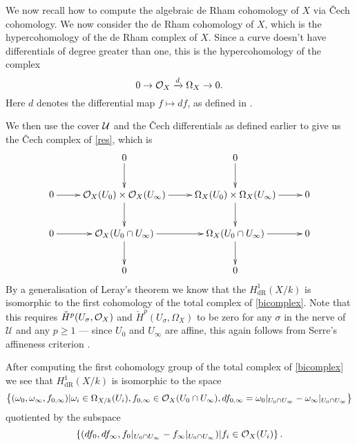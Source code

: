 \documentclass[draft, 11pt]{article} %
\theoremstyle{plain}
\theoremstyle{remark}
\newcommand{\cO}{{\cal O}}
\newcommand{\cU}{{\mathcal U}}
\newcommand{\cech}{\v{C}ech }
\newcommand{\derhamhone}{H_{\text {dR}}^1(X/k)}
\begin{document}
We now recall how to compute the algebraic de Rham cohomology of $X$ via \cech cohomology.
We now consider the de Rham cohomology of $X$, which is the hypercohomology of the de Rham complex of $X$.
Since a curve doesn't have differentials of degree greater than one, this is the hypercohomology of the complex
\begin{equation}\label{res}
0 \rightarrow \cO_X \xrightarrow{d} \Omega_X \rightarrow 0.
\end{equation}
Here $d$ denotes the differential map $f \mapsto df$, as defined in \cite[Chap II, \S 8, Pg. 172]{hart}.

We then use the cover $\cal U$ and the \cech differentials as defined earlier to give us the \cech complex of \eqref{res}, which is
\begin{displaymath}
\xymatrix{ & 0 \ar[d] & 0 \ar[d] & \\
0 \ar[r] & \cO_X(U_0) \times \cO_X(U_\infty) \ar[d] \ar[r] & \Omega_X(U_0) \times \Omega_X(U_\infty) \ar[d] \ar[r] & 0 \\
0 \ar[r] & \cO_X(U_0\cap U_\infty) \ar[d] \ar[r] & \Omega_X(U_0 \cap U_\infty) \ar[r] \ar[d] & 0 \\
& 0 & 0 &}
\end{displaymath}
By a generalisation of Leray's theorem \cite[Cor 12.4.7]{EGA0III} we know that the $\derhamhone$ is isomorphic to the first cohomology of the total complex of \eqref{bicomplex}.
Note that this requires ${\check H}^p(U_\sigma, \cO_X)$ and ${\check H}^p(U_\sigma, \Omega_X)$ to be zero for any $\sigma$ in the nerve of $\cU$ and any $p \geq 1$ ---
since $U_0$ and $U_\infty$ are affine, this again follows from Serre's affineness criterion \cite[Thm 5.2.23]{liu}.



After computing the first cohomology group of the total complex of \eqref{bicomplex} we see that $\derhamhone$ is isomorphic to the space
\begin{equation}\label{derhamconditions}
\left\{(\omega_0, \omega_\infty, f_{0,\infty}) | \omega_i\in \Omega_{X/k}(U_i), f_{0,\infty}\in \cO_X(U_0 \cap U_\infty), df_{0,\infty} = \omega_0|_{U_0\cap U_\infty} - \omega_\infty|_{U_0\cap U_\infty} \right\}
\end{equation}
quotiented by the subspace
\begin{equation}\label{quotient}
\left\{  (df_0, df_\infty, f_0|_{U_0\cap U_\infty} -f_\infty|_{U_0\cap U_\infty} )|f_i \in \cO_X(U_i)\right\}.
\end{equation}
\end{document}
